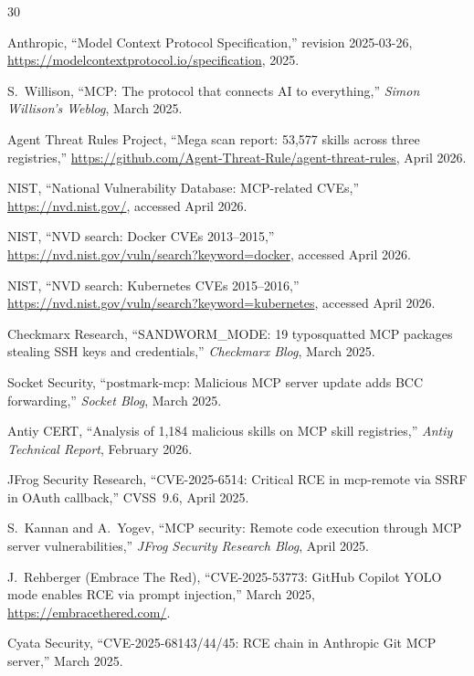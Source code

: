 \documentclass[11pt,twocolumn]{article}
\begin{document}
\begin{thebibliography}{30}

Anthropic, ``Model Context Protocol Specification,'' revision 2025-03-26,
\url{https://modelcontextprotocol.io/specification}, 2025.

S.~Willison, ``MCP: The protocol that connects AI to everything,''
\emph{Simon Willison's Weblog}, March 2025.

Agent Threat Rules Project, ``Mega scan report: 53,577 skills across three registries,''
\url{https://github.com/Agent-Threat-Rule/agent-threat-rules}, April 2026.

NIST, ``National Vulnerability Database: MCP-related CVEs,''
\url{https://nvd.nist.gov/}, accessed April 2026.

NIST, ``NVD search: Docker CVEs 2013--2015,''
\url{https://nvd.nist.gov/vuln/search?keyword=docker}, accessed April 2026.

NIST, ``NVD search: Kubernetes CVEs 2015--2016,''
\url{https://nvd.nist.gov/vuln/search?keyword=kubernetes}, accessed April 2026.

Checkmarx Research, ``SANDWORM\_MODE: 19 typosquatted MCP packages stealing SSH keys and credentials,''
\emph{Checkmarx Blog}, March 2025.

Socket Security, ``postmark-mcp: Malicious MCP server update adds BCC forwarding,''
\emph{Socket Blog}, March 2025.

Antiy CERT, ``Analysis of 1,184 malicious skills on MCP skill registries,''
\emph{Antiy Technical Report}, February 2026.

JFrog Security Research, ``CVE-2025-6514: Critical RCE in mcp-remote via SSRF in OAuth callback,''
CVSS~9.6, April 2025.

S.~Kannan and A.~Yogev, ``MCP security: Remote code execution through MCP server vulnerabilities,''
\emph{JFrog Security Research Blog}, April 2025.

J.~Rehberger (Embrace The Red), ``CVE-2025-53773: GitHub Copilot YOLO mode enables RCE via prompt injection,''
March 2025, \url{https://embracethered.com/}.

Cyata Security, ``CVE-2025-68143/44/45: RCE chain in Anthropic Git MCP server,''
March 2025.


\end{thebibliography}
\end{document}
